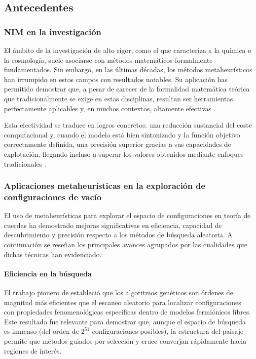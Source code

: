 \subsection{Antecedentes}

\subsubsection{NIM en la investigación}

El ámbito de la investigación de alto rigor, como el que
caracteriza a la química o la cosmología, suele asociarse con
métodos matemáticos formalmente fundamentados. Sin embargo, en
las últimas décadas, los métodos metaheurísticos han irrumpido
en estos campos con resultados notables. Su aplicación has
permitido demostrar que, a pesar de carecer de la formalidad
matemática teórica que tradicionalmente se exige en estas
disciplinas, resultan ser herramientas perfectamente aplicables
y, en muchos contextos, altamente efectivas \cite{Wang_2010, Prasad_2014}.

Esta efectividad se traduce en logros concretos: una reducción
sustancial del coste computacional y, cuando el modelo está
bien sintonizado y la función objetivo correctamente definida,
una precisión superior gracias a sus capacidades de explotación,
llegando incluso a superar los valores obtenidos mediante
enfoques tradicionales \cite{Megantoro_2025}.

\subsubsection{Aplicaciones metaheurísticas en la exploración de configuraciones de vacío}

El uso de metaheurísticas para explorar el espacio de configuraciones en
teoría de cuerdas ha demostrado mejoras significativas en eficiencia,
capacidad de descubrimiento y precisión respecto a los métodos de búsqueda
aleatoria. A continuación se reseñan los principales avances agrupados por
las cualidades que dichas técnicas han evidenciado.


\paragraph{Eficiencia en la búsqueda}

El trabajo pionero de \textcite{Abel_2014} estableció que los algoritmos
genéticos son órdenes de magnitud más eficientes que el escaneo aleatorio
para localizar configuraciones con propiedades fenomenológicas específicas
dentro de modelos fermiónicos libres. Este resultado fue relevante para
demostrar que, aunque el espacio de búsqueda es inmenso (del orden de
\(2^{51}\) configuraciones posibles), la estructura del paisaje permite
que métodos guiados por selección y cruce converjan rápidamente hacia
regiones de interés.

